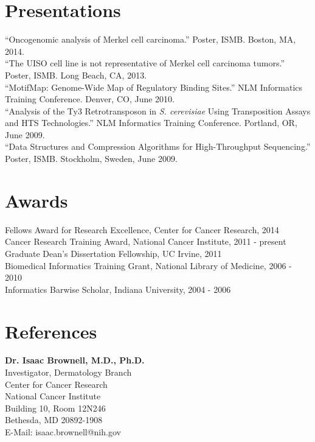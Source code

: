 \documentclass[margin,line]{res}
\begin{document}
\begin{resume}
\section{\sc Presentations}
``Oncogenomic analysis of Merkel cell carcinoma.'' Poster, ISMB. Boston, MA, 2014.\\
``The UISO cell line is not representative of Merkel cell carcinoma tumors.'' Poster, ISMB. Long Beach, CA, 2013.\\
``MotifMap: Genome-Wide Map of Regulatory Binding Sites.'' NLM Informatics Training Conference. Denver, CO, June 2010.\\
``Analysis of the Ty3 Retrotransposon in \textit{S. cerevisiae} Using Transposition Assays and HTS Technologies.'' NLM Informatics Training Conference. Portland, OR, June 2009.\\
``Data Structures and Compression Algorithms for High-Throughput Sequencing.'' Poster, ISMB. Stockholm, Sweden, June 2009.

\section{\sc Awards}
Fellows Award for Research Excellence, Center for Cancer Research, 2014\\
Cancer Research Training Award, National Cancer Institute, 2011 - present\\
Graduate Dean’s Dissertation Fellowship, UC Irvine, 2011\\
Biomedical Informatics Training Grant, National Library of Medicine, 2006 - 2010\\
Informatics Barwise Scholar, Indiana University, 2004 - 2006


\section{\sc References} 

\textbf{Dr. Isaac Brownell, M.D., Ph.D.}\\
Investigator, Dermatology Branch\\
Center for Cancer Research\\
National Cancer Institute\\
Building 10, Room 12N246\\
Bethesda, MD 20892-1908\\
E-Mail: isaac.brownell@nih.gov\\


\end{resume}
\end{document}
